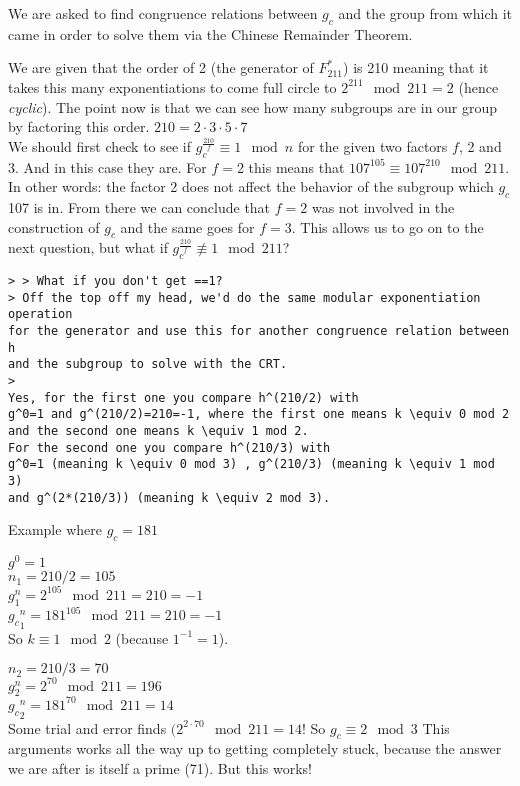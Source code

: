 \documentclass{article}
\begin{document}
We are asked to find congruence relations between $g_c$ and the group from
which it came in order to solve them via the Chinese Remainder Theorem.

We are given that the order of 2 (the generator of $F_{211}^{*}$) is 210
meaning that it takes this many exponentiations to come full circle to
$2^{211} \mod 211 = 2$ (hence \textit{cyclic}).
The point now is that we can see how many subgroups are in our group by
factoring this order.
$210 = 2 \cdot 3 \cdot 5 \cdot 7$ \\

We should first check to see if $g_c^{\frac{210}{f}} \equiv 1 \mod n$
for the given two factors $f$, 2 and 3. And in this case they are.
For $f=2$ this means that $107^{105} \equiv 107^{210} \mod 211$.
In other words: the factor 2 does not affect the behavior of the subgroup which
$g_c$ 107 is in. From there we can conclude that $f=2$ was not involved in the
construction of $g_c$ and the same goes for $f=3$.
This allows us to go on to the next question, but what if $g_c^{\frac{210}{f}}
\not \equiv 1 \mod 211$?

\small{
\begin{verbatim}
> > What if you don't get ==1?
> Off the top off my head, we'd do the same modular exponentiation operation
for the generator and use this for another congruence relation between h
and the subgroup to solve with the CRT.
>
Yes, for the first one you compare h^(210/2) with
g^0=1 and g^(210/2)=210=-1, where the first one means k \equiv 0 mod 2
and the second one means k \equiv 1 mod 2.
For the second one you compare h^(210/3) with
g^0=1 (meaning k \equiv 0 mod 3) , g^(210/3) (meaning k \equiv 1 mod 3)
and g^(2*(210/3)) (meaning k \equiv 2 mod 3).
\end{verbatim}
}

Example where $g_c=181$

$g^0 = 1$ \\
$n_1 = 210/2 = 105$ \\
$g^n_1 = 2^{105} \mod 211 = 210 = -1$ \\
${g_c}^n_1 = 181^{105} \mod 211 = 210 = -1$ \\
So $k \equiv 1 \mod 2$ (because $1^{-1} = 1$).

$n_2 = 210/3 = 70$ \\
$g^n_2 = 2^{70} \mod 211 = 196$ \\
${g_c}^n_2 = 181^{70} \mod 211 = 14$ \\

Some trial and error finds $(2^{2 \cdot 70} \mod 211 = 14$!
So $g_c \equiv 2 \mod 3$
This arguments works all the way up to getting completely stuck, because the
answer we are after is itself a prime (71). But this works!
\end{document}
